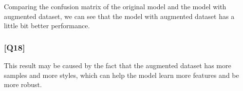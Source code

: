 \documentclass{article}
\begin{document}
Comparing the confusion matrix of the original model and the model with augmented dataset, 
we can see that the model with augmented dataset has a little bit better performance.

\subsubsection*{[Q18]}
This result may be caused by the fact that the augmented dataset has more samples and more styles,
which can help the model learn more features and be more robust.
\end{document}
